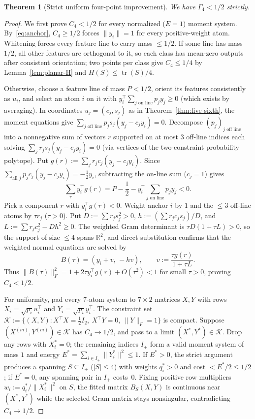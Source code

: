\documentclass[11pt]{article}
\theoremstyle{plain}
\newtheorem{theorem}{Theorem}
\theoremstyle{definition}
\theoremstyle{remark}
\DeclareMathOperator{\tr}{tr}
\begin{document}
\begin{theorem}[Strict uniform four-point improvement]\label{thm:gamma4}
We have $\Gamma_4 < 1/2$ strictly.
\end{theorem}

\begin{proof}
We first prove $C_4 < 1/2$ for every normalized ($E=1$) moment system.
By~\eqref{eq:anchor}, $C_4 \ge 1/2$ forces $\|y_i\| = 1$ for every positive-weight atom.
Whitening forces every feature line to carry mass $\le 1/2$.
If some line has mass $1/2$, all other features are orthogonal to it, so each class has mean-zero outputs after consistent orientation; two points per class give $C_4 \le 1/4$ by Lemma~\ref{lem:planar-H} and $H(S) \le \tr(S)/4$.

Otherwise, choose a feature line of mass $P < 1/2$, orient its features consistently as $u_i$, and select an atom $i$ on it with $y_i^\top \sum_{j \text{ on line}} p_j y_j \ge 0$ (which exists by averaging).
In coordinates $u_j = (c_j, s_j)$ as in Theorem~\ref{thm:five-sixth}, the moment equations give $\sum_{j \text{ off line}} p_j s_j(y_j - c_j y_i) = 0$.
Decompose $(p_j)_{j \text{ off line}}$ into a nonnegative sum of vectors $r$ supported on at most $3$ off-line indices each solving $\sum_j r_j s_j(y_j - c_j y_i) = 0$ (via vertices of the two-constraint probability polytope).
Put $g(r) := \sum_j r_j c_j(y_j - c_j y_i)$.
Since $\sum_{\text{all } j} p_j c_j(y_j - c_j y_i) = -\frac{1}{2}y_i$, subtracting the on-line sum ($c_j = 1$) gives
\[
\sum_r y_i^\top g(r) = P - \frac{1}{2} - y_i^\top \sum_{j \text{ on line}} p_j y_j < 0.
\]
Pick a component $r$ with $y_i^\top g(r) < 0$.
Weight anchor $i$ by $1$ and the $\le 3$ off-line atoms by $\tau r_j$ ($\tau > 0$).
Put $D := \sum r_j s_j^2 > 0$, $h := (\sum r_j c_j s_j)/D$, and $L := \sum r_j c_j^2 - Dh^2 \ge 0$.
The weighted Gram determinant is $\tau D(1 + \tau L) > 0$, so the support of size $\le 4$ spans $\mathbb{R}^2$, and direct substitution confirms that the weighted normal equations are solved by
\[
B(\tau) = (y_i + v,\, -hv), \qquad v := \frac{\tau g(r)}{1 + \tau L}.
\]
Thus $\|B(\tau)\|_F^2 = 1 + 2\tau y_i^\top g(r) + O(\tau^2) < 1$ for small $\tau > 0$, proving $C_4 < 1/2$.

For uniformity, pad every $7$-atom system to $7 \times 2$ matrices $X, Y$ with rows $X_i = \sqrt{p_i}u_i^\top$ and $Y_i = \sqrt{p_i}y_i^\top$.
The constraint set $\mathcal{K} := \{(X,Y) : X^\top X = \frac{1}{2}I_2,\ X^\top Y = 0,\ \|Y\|_F = 1\}$ is compact.
Suppose $(X^{(m)}, Y^{(m)}) \in \mathcal{K}$ has $C_4 \to 1/2$, and pass to a limit $(X^*, Y^*) \in \mathcal{K}$.
Drop any rows with $X_i^* = 0$; the remaining indices $I_+$ form a valid moment system of mass $1$ and energy $E^* = \sum_{i \in I_+} \|Y_i^*\|^2 \le 1$.
If $E^* > 0$, the strict argument produces a spanning $S \subseteq I_+$ ($|S| \le 4$) with weights $q_i^* > 0$ and cost $< E^*/2 \le 1/2$; if $E^* = 0$, any spanning pair in $I_+$ costs~$0$.
Fixing positive row multipliers $w_i := q_i^*/\|X_i^*\|^2$ on $S$, the fitted matrix $B_S(X,Y)$ is continuous near $(X^*, Y^*)$ while the selected Gram matrix stays nonsingular, contradicting $C_4 \to 1/2$.
\end{proof}
\end{document}

